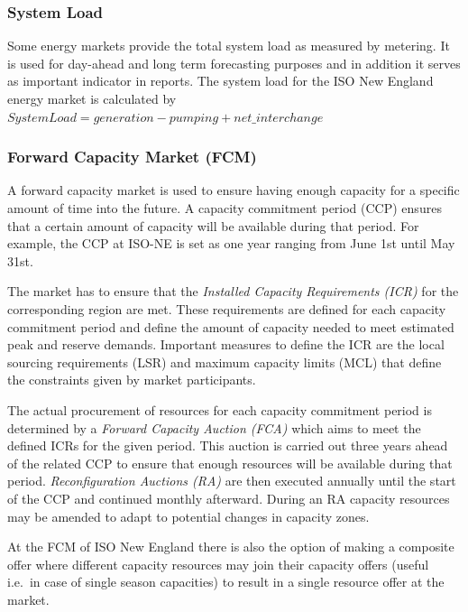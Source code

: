 \subsubsection{System Load}


Some energy markets provide the total system load as measured by metering. It is used for day-ahead and long term forecasting purposes and in addition it serves as important indicator in reports. The system load for the ISO New England energy market is calculated by $System Load = generation - pumping + net\_interchange$


\subsubsection{Forward Capacity Market (FCM)} 

A forward capacity market is used to ensure having enough capacity for a specific amount of time into the future. A capacity commitment period (CCP) ensures that a certain amount of capacity will be available during that period. For example, the CCP at ISO-NE is set as one year ranging from June 1st until May 31st. 

The market has to ensure that the \emph{Installed Capacity Requirements (ICR)} for the corresponding region are met. These requirements are defined for each capacity commitment period and define the amount of capacity needed to meet estimated peak and reserve demands. Important measures to define the ICR are the local sourcing requirements (LSR) and maximum capacity limits (MCL) that define the constraints given by market participants. %

The actual procurement of resources for each capacity commitment period is determined by a \emph{Forward Capacity Auction (FCA)} which aims to meet the defined ICRs for the given period.
This auction is carried out three years ahead of the related CCP to ensure that enough resources will be available during that period. \emph{Reconfiguration Auctions (RA)} are then executed annually until the start of the CCP and continued monthly afterward. During an RA capacity resources may be amended to adapt to potential changes in capacity zones. 

At the FCM of ISO New England there is also the option of making a composite offer where different capacity resources may join their capacity offers (useful i.e.~in case of single season capacities) to result in a single resource offer at the market. 


